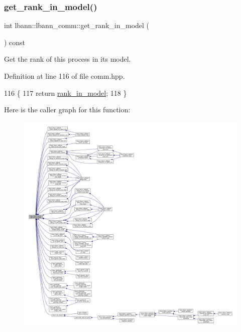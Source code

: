 \subsubsection{\texorpdfstring{get\+\_\+rank\+\_\+in\+\_\+model()}{get\_rank\_in\_model()}}
{\footnotesize\ttfamily int lbann\+::lbann\+\_\+comm\+::get\+\_\+rank\+\_\+in\+\_\+model (\begin{DoxyParamCaption}{ }\end{DoxyParamCaption}) const\hspace{0.3cm}{\ttfamily [inline]}}

Get the rank of this process in its model. 

Definition at line 116 of file comm.\+hpp.


\begin{DoxyCode}
116                                        \{
117     \textcolor{keywordflow}{return} \hyperlink{classlbann_1_1lbann__comm_a0dcccd57c2b591eb7682e192e0a09033}{rank\_in\_model};
118   \}
\end{DoxyCode}
Here is the caller graph for this function\+:\nopagebreak
\begin{figure}[H]
\begin{center}
\leavevmode
\includegraphics[width=350pt]{classlbann_1_1lbann__comm_a789453454468a3b70de768537c50ca52_icgraph}
\end{center}
\end{figure}
\mbox{\label{classlbann_1_1lbann__comm_acebc5ff36fcb64c05f66757953aefb8c}} 
